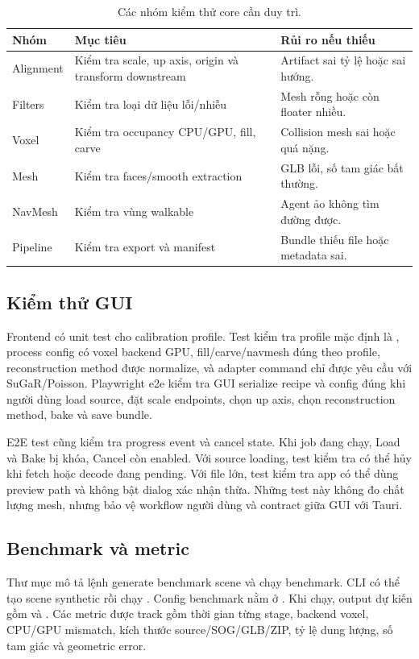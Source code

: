 \begin{table}[H]
\centering
\caption{Các nhóm kiểm thử core cần duy trì.}
\begin{tabularx}{\textwidth}{p{3.2cm}p{5cm}X}
\toprule
\textbf{Nhóm} & \textbf{Mục tiêu} & \textbf{Rủi ro nếu thiếu}\\
\midrule
Alignment & Kiểm tra scale, up axis, origin và transform downstream & Artifact sai tỷ lệ hoặc sai hướng.\\
Filters & Kiểm tra loại dữ liệu lỗi/nhiễu & Mesh rỗng hoặc còn floater nhiều.\\
Voxel & Kiểm tra occupancy CPU/GPU, fill, carve & Collision mesh sai hoặc quá nặng.\\
Mesh & Kiểm tra faces/smooth extraction & GLB lỗi, số tam giác bất thường.\\
NavMesh & Kiểm tra vùng walkable & Agent ảo không tìm đường được.\\
Pipeline & Kiểm tra export và manifest & Bundle thiếu file hoặc metadata sai.\\
\bottomrule
\end{tabularx}
\end{table}

\subsection{Kiểm thử GUI}

Frontend có unit test cho calibration profile. Test kiểm tra profile mặc định là , process config có voxel backend GPU, fill/carve/navmesh đúng theo profile, reconstruction method được normalize, và adapter command chỉ được yêu cầu với SuGaR/Poisson. Playwright e2e kiểm tra GUI serialize recipe và config đúng khi người dùng load source, đặt scale endpoints, chọn up axis, chọn reconstruction method, bake và save bundle.

E2E test cũng kiểm tra progress event và cancel state. Khi job đang chạy, Load và Bake bị khóa, Cancel còn enabled. Với source loading, test kiểm tra có thể hủy khi fetch hoặc decode đang pending. Với file lớn, test kiểm tra app có thể dùng preview path và không bật dialog xác nhận thừa. Những test này không đo chất lượng mesh, nhưng bảo vệ workflow người dùng và contract giữa GUI với Tauri.

\subsection{Benchmark và metric}

Thư mục  mô tả lệnh generate benchmark scene và chạy benchmark. CLI có thể tạo scene synthetic rồi chạy . Config benchmark nằm ở . Khi chạy, output dự kiến gồm  và . Các metric được track gồm thời gian từng stage, backend voxel, CPU/GPU mismatch, kích thước source/SOG/GLB/ZIP, tỷ lệ dung lượng, số tam giác và geometric error.

